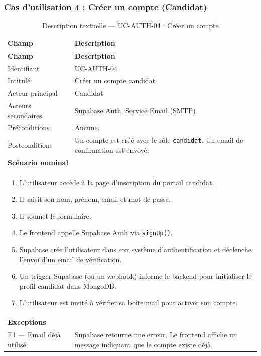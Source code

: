 \subsubsection{Cas d'utilisation 4 : Créer un compte (Candidat)}

\renewcommand{\arraystretch}{1.4}
\begin{longtable}{|p{4cm}|p{10cm}|}
\caption{Description textuelle — UC-AUTH-04 : Créer un compte}
\label{tab:uc_auth04} \\
\hline
\rowcolor[HTML]{EFEFEF} \textbf{Champ} & \textbf{Description} \\ \hline
\endfirsthead
\hline
\rowcolor[HTML]{EFEFEF} \textbf{Champ} & \textbf{Description} \\ \hline
\endhead
\hline
\endfoot
\hline
\endlastfoot
Identifiant & UC-AUTH-04 \\ \hline
Intitulé & Créer un compte candidat \\ \hline
Acteur principal & Candidat \\ \hline
Acteurs secondaires & Supabase Auth, Service Email (SMTP) \\ \hline
Préconditions & Aucune. \\ \hline
Postconditions & Un compte est créé avec le rôle \texttt{candidat}. Un email de confirmation est envoyé. \\ \hline
\multicolumn{2}{|l|}{\textbf{Scénario nominal}} \\ \hline
\multicolumn{2}{|p{14.5cm}|}{
\vspace{2pt}
\begin{enumerate}
    \item L'utilisateur accède à la page d'inscription du portail candidat.
    \item Il saisit son nom, prénom, email et mot de passe.
    \item Il soumet le formulaire.
    \item Le frontend appelle Supabase Auth via \texttt{signUp()}.
    \item Supabase crée l'utilisateur dans son système d'authentification et déclenche l'envoi d'un email de vérification.
    \item Un trigger Supabase (ou un webhook) informe le backend pour initialiser le profil candidat dans MongoDB.
    \item L'utilisateur est invité à vérifier sa boîte mail pour activer son compte.
\end{enumerate}
\vspace{2pt}
} \\ \hline
\multicolumn{2}{|l|}{\textbf{Exceptions}} \\ \hline
E1 — Email déjà utilisé & Supabase retourne une erreur. Le frontend affiche un message indiquant que le compte existe déjà. \\ \hline
\end{longtable}
\renewcommand{\arraystretch}{1}

